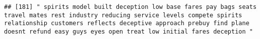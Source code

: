 \documentclass[
]{article}
\begin{document}
\begin{verbatim}
## [181] " spirits model built deception low base fares pay bags seats travel mates rest industry reducing service levels compete spirits relationship customers reflects deceptive approach prebuy find plane doesnt refund easy guys eyes open treat low initial fares deception "                                                                                                                                                                                                                                                                                                                                                                                                                                                                                                                                                                                                                                                                                                                                                                                                                                                                                                                                                                                                                                                                                                                                                                                                                                                                                                                                                                                                                                                                                                                     

\end{verbatim}
\end{document}
